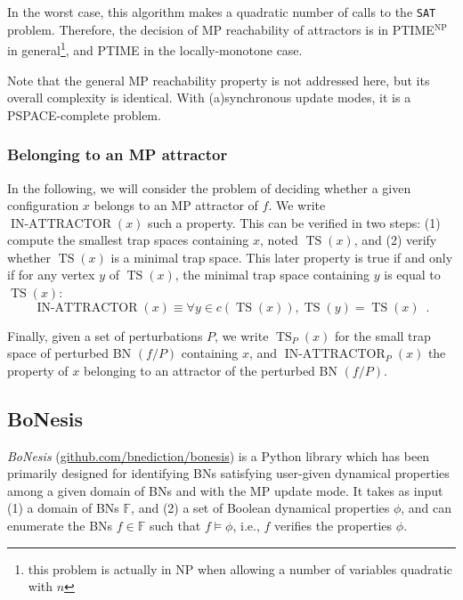 \documentclass[PCJ,Unicode,screen,mode=plain]{cedram}
\begin{document}
In the worst case, this algorithm makes a quadratic number of calls to
the \texttt{SAT} problem. Therefore, the decision of MP reachability of
attractors is in PTIME\(^\text{NP}\) in general\footnote{this problem is
  actually in NP when allowing a number of variables quadratic with
  \(n\)}, and PTIME in the locally-monotone case.

Note that the general MP reachability property is not addressed here,
but its overall complexity is identical. With (a)synchronous update
modes, it is a PSPACE-complete problem.

\hypertarget{belonging-to-an-mp-attractor}{%
\subsubsection{Belonging to an MP
attractor}\label{belonging-to-an-mp-attractor}}

In the following, we will consider the problem of deciding whether a
given configuration \(x\) belongs to an MP attractor of \(f\). We write
\(\operatorname{IN-ATTRACTOR}(x)\) such a property. This can be verified
in two steps: (1) compute the smallest trap spaces containing \(x\),
noted \(\operatorname{TS}(x)\), and (2) verify whether
\(\operatorname{TS}(x)\) is a minimal trap space. This later property is
true if and only if for any vertex \(y\) of \(\operatorname{TS}(x)\),
the minimal trap space containing \(y\) is equal to
\(\operatorname{TS}(x)\): \[
\operatorname{IN-ATTRACTOR}(x) \equiv \forall y \in c(\operatorname{TS}(x)), \operatorname{TS}(y) = \operatorname{TS}(x) \enspace.
\]

Finally, given a set of perturbations \(P\), we write
\(\operatorname{TS}_P(x)\) for the small trap space of perturbed BN
\((f/P)\) containing \(x\), and \(\operatorname{IN-ATTRACTOR}_P(x)\) the
property of \(x\) belonging to an attractor of the perturbed BN
\((f/P)\).
\hypertarget{bonesis}{%
\subsection{BoNesis}\label{bonesis}}

\emph{BoNesis}
(\href{https://github.com/bnediction/bonesis}{github.com/bnediction/bonesis})
is a Python library which has been primarily designed for identifying
BNs satisfying user-given dynamical properties among a given domain of
BNs and with the MP update mode. It takes as input (1) a domain of BNs
\(\mathbb F\), and (2) a set of Boolean dynamical properties \(\phi\),
and can enumerate the BNs \(f \in \mathbb F\) such that
\(f\models \phi\), i.e., \(f\) verifies the properties \(\phi\).
\end{document}
